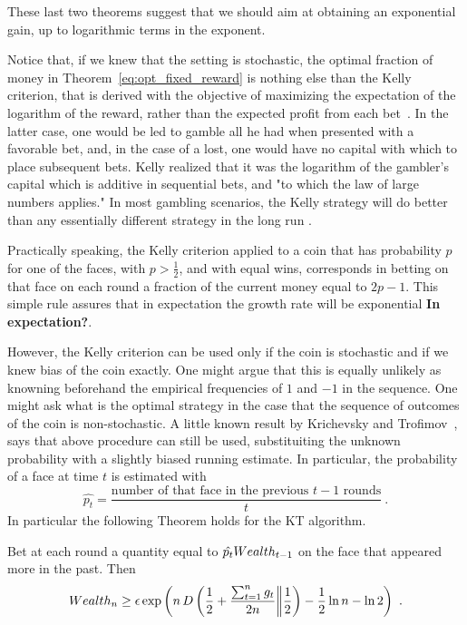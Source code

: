 These last two theorems suggest that we should aim at obtaining an exponential gain, up to logarithmic terms in the exponent.

Notice that, if we knew that the setting is stochastic, the optimal fraction of money in Theorem~\ref{eq:opt_fixed_reward} is nothing else than the Kelly criterion, that is derived with the objective of maximizing the expectation of the logarithm of the reward, rather than the expected profit from each bet~\citep{Kelly56}.
In the latter case, one would be led to gamble all he had when presented with a favorable bet, and, in the case of a lost, one would have no capital with which to place subsequent bets. Kelly realized that it was the logarithm of the gambler's capital which is additive in sequential bets, and "to which the law of large numbers applies."
In most gambling scenarios, the Kelly strategy will do better than any essentially different strategy in the long run \cite{}. %

Practically speaking, the Kelly criterion applied to a coin that has probability $p$ for one of the faces, with $p> \frac{1}{2}$, and with equal wins, corresponds in betting on that face on each round a fraction of the current money equal to $2p-1$. This simple rule assures that in expectation the growth rate will be exponential \textbf{In expectation?}.

However, the Kelly criterion can be used only if the coin is stochastic and if we knew bias of the coin exactly. One might argue that this is equally unlikely as knowning beforehand the empirical frequencies of $1$ and $-1$ in the sequence.
One might ask what is the optimal strategy in the case that the sequence of outcomes of the coin is non-stochastic.
A little known result by Krichevsky and Trofimov~\cite{KrichevskyT81}, says that above procedure can still be used, substituiting the  unknown probability with a slightly biased running estimate. In particular, the probability of a face at time $t$ is estimated with 
\[
\hat{p_t}=\frac{\text{number of that face in the previous } t-1 \text{ rounds}}{t}~.
\]
In particular the following Theorem holds for the \ac{KT} algorithm.
\begin{theorem}
Bet at each round a quantity equal to $\hat{p_t} Wealth_{t-1}$ on the face that appeared more in the past. Then
\begin{align*}
Wealth_{n}
\geq \epsilon \exp\left(n\, D\left(\frac{1}{2}+\frac{\sum_{t=1}^n g_t}{2 n}\middle\|\frac{1}{2}\right) - \frac{1}{2} \ln n - \ln 2\right)~.
\end{align*}
\end{theorem}

